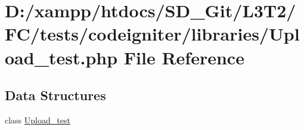 \hypertarget{tests_2codeigniter_2libraries_2_upload__test_8php}{}\section{D\+:/xampp/htdocs/\+S\+D\+\_\+\+Git/\+L3\+T2/\+F\+C/tests/codeigniter/libraries/\+Upload\+\_\+test.php File Reference}
\label{tests_2codeigniter_2libraries_2_upload__test_8php}
\subsection*{Data Structures}
\begin{DoxyCompactItemize}
\item 
class \hyperlink{class_upload__test}{Upload\+\_\+test}
\end{DoxyCompactItemize}
